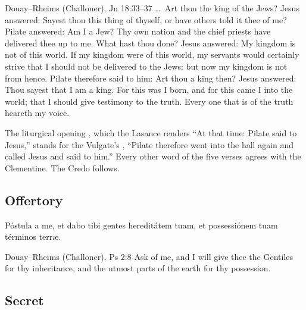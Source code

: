 \begin{englishwitness}{Douay--Rheims (Challoner), Jn 18:33--37}
\dots\ Art thou the king of the Jews? Jesus answered: Sayest thou this thing
of thyself, or have others told it thee of me? Pilate answered: Am I a Jew?
Thy own nation and the chief priests have delivered thee up to me. What hast
thou done? Jesus answered: My kingdom is not of this world. If my kingdom were
of this world, my servants would certainly strive that I should not be
delivered to the Jews: but now my kingdom is not from hence. Pilate therefore
said to him: Art thou a king then? Jesus answered: Thou sayest that I am a
king. For this was I born, and for this came I into the world; that I should
give testimony to the truth. Every one that is of the truth heareth my voice.
\end{englishwitness}

\noindent The liturgical opening , which the Lasance renders ``At that time: Pilate said to Jesus,''
stands for the Vulgate's , ``Pilate therefore went into the hall again
and called Jesus and said to him.'' Every other word of the five verses agrees
with the Clementine. The Credo follows.

\subsection{Offertory}
\label{proper-offertory}


\begin{latinproper}
Póstula a me, et dabo tibi gentes hereditátem tuam, et possessiónem tuam
términos terræ.
\end{latinproper}

\begin{englishwitness}{Douay--Rheims (Challoner), Ps 2:8}
Ask of me, and I will give thee the Gentiles for thy inheritance, and the
utmost parts of the earth for thy possession.
\end{englishwitness}

\subsection{Secret}
\label{proper-secret}


